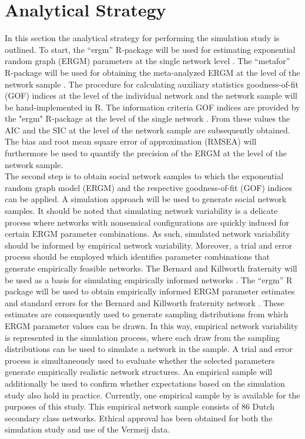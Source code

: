 \documentclass[a4paper, man]{apa6}
\begin{document}
\section{Analytical Strategy}
In this section the analytical strategy for performing the simulation study is outlined. To start, the “ergm” R-package will be used for estimating exponential random graph (ERGM) parameters at the single network level \cite{hunter2008ergm, team2013r}. The “metafor” R-package will be used for obtaining the meta-analyzed ERGM at the level of the network sample \cite{viechtbauer2010conducting, team2013r}. The procedure for calculating auxiliary statistics goodness-of-fit (GOF) indices at the level of the individual network and the network sample will be hand-implemented in R. \clearpage \noindent The information criteria GOF indices are provided by the "ergm" R-package at the level of the single network \cite{hunter2008ergm, team2013r}. From these values the AIC and the SIC at the level of the network sample are subsequently obtained.  The bias and root mean square error of approximation (RMSEA) will furthermore be used to quantify the precision of the ERGM at the level of the network sample.
\\
The second step is to obtain social network samples to which the exponential random graph model (ERGM) and the respective goodness-of-fit (GOF) indices can be applied. A simulation approach will be used to generate social network samples. It should be noted that simulating network variability is a delicate process where networks with nonsensical configurations are quickly induced for certain ERGM parameter combinations. As such, simulated network variability should be informed by empirical network variability. Moreover, a trial and error process should be employed which identifies parameter combinations that generate empirically feasible networks. The Bernard and Killworth fraternity will be used as a basis for simulating empirically informed networks \cite{bernard1980informant}. The “ergm” R package will be used to obtain empirically informed ERGM parameter estimates and standard errors for the Bernard and Killworth fraternity network \cite{hunter2008ergm, team2013r}. These estimates are consequently used to generate sampling distributions from which ERGM parameter values can be drawn. In this way, empirical network variability is represented in the simulation process, where each draw from the sampling distributions can be used to simulate a network in the sample. A trial and error process is simultaneously used to evaluate whether the selected parameters generate empirically realistic network structures. An empirical sample will additionally be used to confirm whether expectations based on the simulation study also hold in practice. Currently, one empirical sample by  is available for the purposes of this study. This empirical network sample consists of 86 Dutch secondary class networks. Ethical approval has been obtained for both the simulation study and use of the Vermeij data. 
\end{document}
